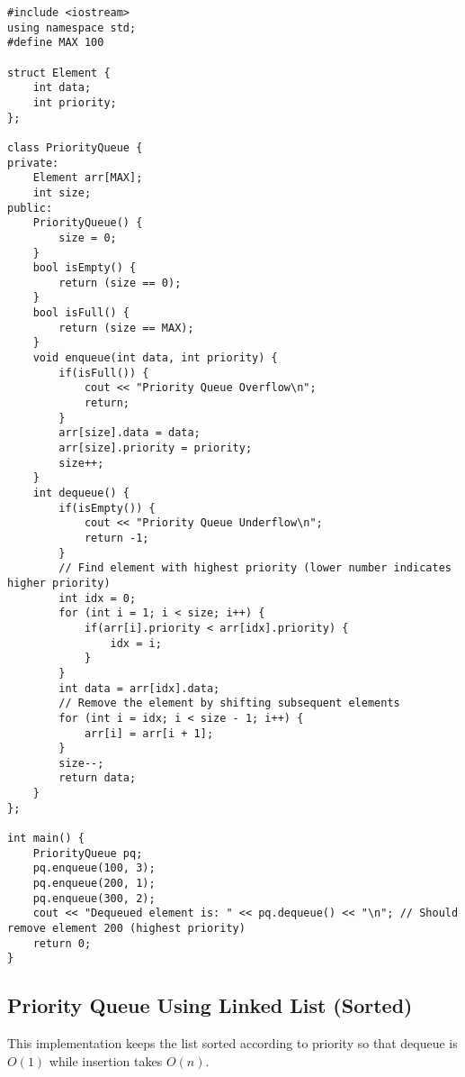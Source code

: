 \begin{lstlisting}[caption={C++ implementation of a Priority Queue using an Array}]
#include <iostream>
using namespace std;
#define MAX 100

struct Element {
    int data;
    int priority;
};

class PriorityQueue {
private:
    Element arr[MAX];
    int size;
public:
    PriorityQueue() {
        size = 0;
    }
    bool isEmpty() {
        return (size == 0);
    }
    bool isFull() {
        return (size == MAX);
    }
    void enqueue(int data, int priority) {
        if(isFull()) {
            cout << "Priority Queue Overflow\n";
            return;
        }
        arr[size].data = data;
        arr[size].priority = priority;
        size++;
    }
    int dequeue() {
        if(isEmpty()) {
            cout << "Priority Queue Underflow\n";
            return -1;
        }
        // Find element with highest priority (lower number indicates higher priority)
        int idx = 0;
        for (int i = 1; i < size; i++) {
            if(arr[i].priority < arr[idx].priority) {
                idx = i;
            }
        }
        int data = arr[idx].data;
        // Remove the element by shifting subsequent elements
        for (int i = idx; i < size - 1; i++) {
            arr[i] = arr[i + 1];
        }
        size--;
        return data;
    }
};

int main() {
    PriorityQueue pq;
    pq.enqueue(100, 3);
    pq.enqueue(200, 1);
    pq.enqueue(300, 2);
    cout << "Dequeued element is: " << pq.dequeue() << "\n"; // Should remove element 200 (highest priority)
    return 0;
}
\end{lstlisting}

\subsection{Priority Queue Using Linked List (Sorted)}
This implementation keeps the list sorted according to priority so that dequeue is \( O(1) \) while insertion takes \( O(n) \).

